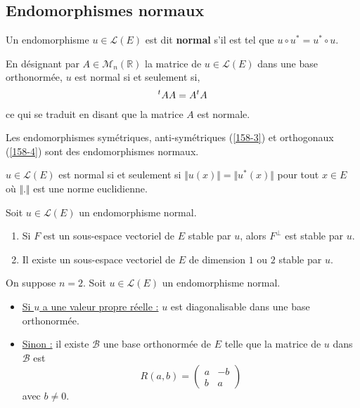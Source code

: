   \subsection{Endomorphismes normaux}


  \begin{definition}
    Un endomorphisme $u \in \mathcal{L}(E)$ est dit \textbf{normal} s'il est tel que $u \circ u^* = u^* \circ u$.
  \end{definition}

  \begin{remark}
    En désignant par $A \in \mathcal{M}_n(\mathbb{R})$ la matrice de $u \in \mathcal{L}(E)$ dans une base orthonormée, $u$ est normal si et seulement si,
    \[ \mathstrut ^t A A = A \mathstrut ^t A \]
    ce qui se traduit en disant que la matrice $A$ est normale.
  \end{remark}

  \begin{example}
    Les endomorphismes symétriques, anti-symétriques (\cref{158-3}) et orthogonaux (\cref{158-4}) sont des endomorphismes normaux.
  \end{example}


  \begin{proposition}
    $u \in \mathcal{L}(E)$ est normal si et seulement si $\Vert u (x) \Vert = \Vert u^* (x) \Vert$ pour tout $x \in E$ où $\Vert . \Vert$ est une norme euclidienne.
  \end{proposition}


  \begin{proposition}
    Soit $u \in \mathcal{L}(E)$ un endomorphisme normal.
    \begin{enumerate}[label=(\roman*)]
      \item Si $F$ est un sous-espace vectoriel de $E$ stable par $u$, alors $F^\perp$ est stable par $u$.
      \item Il existe un sous-espace vectoriel de $E$ de dimension $1$ ou $2$ stable par $u$.
    \end{enumerate}
  \end{proposition}

  \begin{proposition}[Réduction dans le cas $n = 2$]
    \label{158-2}
    On suppose $n = 2$. Soit $u \in \mathcal{L}(E)$ un endomorphisme normal.
    \begin{itemize}
      \item \underline{Si $u$ a une valeur propre réelle :} $u$ est diagonalisable dans une base orthonormée.
      \item \underline{Sinon :} il existe $\mathcal{B}$ une base orthonormée de $E$ telle que la matrice de $u$ dans $\mathcal{B}$ est
      \[ R(a,b) = \begin{pmatrix} a & -b \\ b & a \end{pmatrix} \]
      avec $b \neq 0$.
    \end{itemize}
  \end{proposition}

